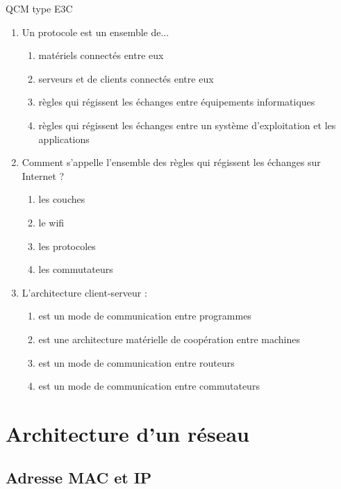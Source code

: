 \documentclass[a4paper,dvipsnames]{article}
\begin{document}
\smallskip

\begin{exercice}{QCM type E3C}{}
 \begin{enumerate}
   \item Un protocole est un ensemble de...
     \begin{enumerate}
       \item matériels connectés entre eux
       \item serveurs et de clients connectés entre eux
       \item règles qui régissent les échanges entre équipements informatiques
       \item règles qui régissent les échanges entre un système d'exploitation et les applications
     \end{enumerate}
   \item Comment s'appelle l'ensemble des règles qui régissent les échanges sur Internet ?
     \begin{enumerate}
       \item les couches
       \item le wifi
       \item les protocoles
       \item les commutateurs
     \end{enumerate}
   \item L'architecture client-serveur :
     \begin{enumerate}
       \item est un mode de communication entre programmes
       \item est une architecture matérielle de coopération entre machines
       \item est un mode de communication entre routeurs
       \item est un mode de communication entre commutateurs
     \end{enumerate}
 \end{enumerate}
\end{exercice}

\pagebreak

\section{Architecture d'un réseau}

\subsection{Adresse MAC et IP}
\end{document}
